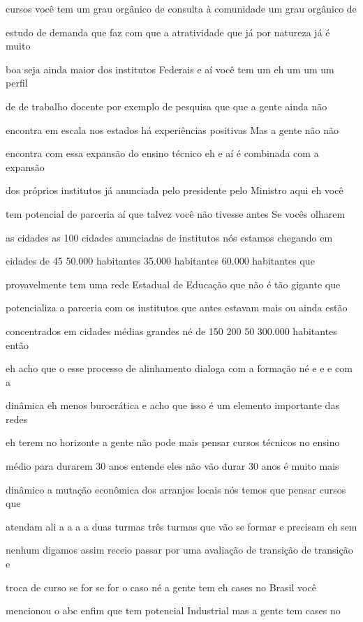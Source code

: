 \documentclass[a4paper,12pt]{article}
\begin{document}
cursos você tem um grau orgânico de consulta à comunidade um grau orgânico de

estudo de demanda que faz com que a atratividade que já por natureza já é muito

boa seja ainda maior dos institutos Federais e aí você tem um eh um um um perfil

de de trabalho docente por exemplo de pesquisa que que a gente ainda não

encontra em escala nos estados há experiências positivas Mas a gente não não

encontra com essa expansão do ensino técnico eh e aí é combinada com a expansão

dos próprios institutos já anunciada pelo presidente pelo Ministro aqui eh você

tem potencial de parceria aí que talvez você não tivesse antes Se vocês olharem

as cidades as 100 cidades anunciadas de institutos nós estamos chegando em

cidades de 45 50.000 habitantes 35.000 habitantes 60.000 habitantes que

provavelmente tem uma rede Estadual de Educação que não é tão gigante que

potencializa a parceria com os institutos que antes estavam mais ou ainda estão

concentrados em cidades médias grandes né de 150 200 50 300.000 habitantes então

eh acho que o esse processo de alinhamento dialoga com a formação né e e e com a

dinâmica eh menos burocrática e acho que isso é um elemento importante das redes

eh terem no horizonte a gente não pode mais pensar cursos técnicos no ensino

médio para durarem 30 anos entende eles não vão durar 30 anos é muito mais

dinâmico a mutação econômica dos arranjos locais nós temos que pensar cursos que

atendam ali a a a a duas turmas três turmas que vão se formar e precisam eh sem

nenhum digamos assim receio passar por uma avaliação de transição de transição e

troca de curso se for se for o caso né a gente tem eh cases no Brasil você

mencionou o abc enfim que tem potencial Industrial mas a gente tem cases no
\end{document}
